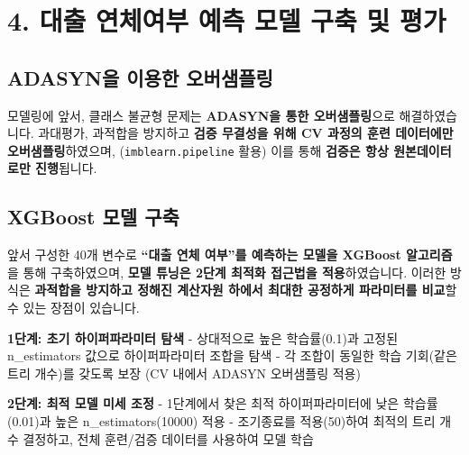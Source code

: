 \documentclass[
  a4paper,
  DIV=11,
  numbers=noendperiod]{scrreprt}
\begin{document}
\newpage

\section*{4. 대출 연체여부 예측 모델 구축 및
평가}\label{uxb300uxcd9c-uxc5f0uxccb4uxc5ecuxbd80-uxc608uxce21-uxbaa8uxb378-uxad6cuxcd95-uxbc0f-uxd3c9uxac00}


\subsection*{ADASYN을 이용한
오버샘플링}\label{adasynuxc744-uxc774uxc6a9uxd55c-uxc624uxbc84uxc0d8uxd50cuxb9c1}

모델링에 앞서, 클래스 불균형 문제는 \textbf{ADASYN을 통한
오버샘플링}으로 해결하였습니다. 과대평가, 과적합을 방지하고 \textbf{검증
무결성을 위해 CV 과정의 훈련 데이터에만 오버샘플링}하였으며,
(\texttt{imblearn.pipeline} 활용) 이를 통해 \textbf{검증은 항상
원본데이터로만 진행}됩니다.

\subsection*{XGBoost 모델 구축}\label{xgboost-uxbaa8uxb378-uxad6cuxcd95}

앞서 구성한 40개 변수로 \textbf{``대출 연체 여부''를 예측하는 모델을
XGBoost 알고리즘}을 통해 구축하였으며, \textbf{모델 튜닝은 2단계 최적화
접근법을 적용}하였습니다. 이러한 방식은 \textbf{과적합을 방지하고 정해진
계산자원 하에서 최대한 공정하게 파라미터를 비교}할 수 있는 장점이
있습니다.

\textbf{1단계: 초기 하이퍼파라미터 탐색} - 상대적으로 높은 학습률(0.1)과
고정된 n\_estimators 값으로 하이퍼파라미터 조합을 탐색 - 각 조합이
동일한 학습 기회(같은 트리 개수)를 갖도록 보장 (CV 내에서 ADASYN
오버샘플링 적용)

\textbf{2단계: 최적 모델 미세 조정} - 1단계에서 찾은 최적
하이퍼파라미터에 낮은 학습률(0.01)과 높은 n\_estimators(10000) 적용 -
조기종료를 적용(50)하여 최적의 트리 개수 결정하고, 전체 훈련/검증
데이터를 사용하여 모델 학습
\end{document}
